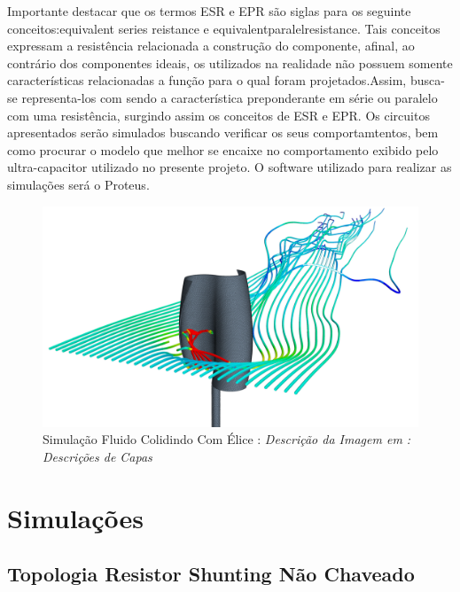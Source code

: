 \documentclass[11pt, a4paper, oneside]{article}
\begin{document}
Importante destacar que os termos ESR e EPR são siglas para os seguinte
conceitos:equivalent series reistance e equivalentparalelresistance. Tais conceitos
expressam a resistência relacionada a construção do componente, afinal, ao
contrário dos componentes ideais, os utilizados na realidade não possuem
somente características relacionadas a função para o qual foram projetados.Assim,
busca-se representa-los com sendo a característica preponderante em série ou
paralelo com uma resistência, surgindo assim os conceitos de ESR e EPR.
Os circuitos apresentados serão simulados buscando verificar os seus
comportamtentos, bem como procurar o modelo que melhor se encaixe no
comportamento exibido pelo ultra-capacitor utilizado no presente projeto. O
software utilizado para realizar as simulações será o Proteus.

\newpage

 	\newpage
	\thispagestyle{empty}
	\clearpage
	\begin{figure}
		\centering
		\includegraphics[width=1\linewidth]{capa3}
		\caption{Simulação Fluido Colidindo Com Élice : \textit{Descrição da Imagem em : Descrições de Capas}}
	\end{figure}
	\clearpage
	\newpage
	
\section{Simulações}

\subsection{Topologia Resistor Shunting Não Chaveado}
\end{document}
